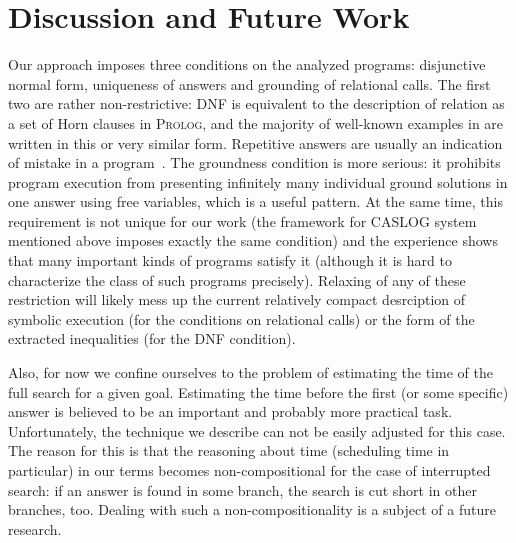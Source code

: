 \section{Discussion and Future Work}
\label{sec:discussion}

Our approach imposes three conditions on the analyzed programs: disjunctive normal form, uniqueness of answers and grounding of relational calls.
The first two are rather non-restrictive: DNF is equivalent to the description of relation as a set of Horn clauses in \textsc{Prolog},
and the majority of well-known examples in \mK are written in this or very similar form. Repetitive answers are usually an indication
of mistake in a program~\cite{WillsThesis}. The groundness condition is more serious: it prohibits program execution from presenting infinitely
many individual ground solutions in one answer using free variables, which is a useful pattern. At the same time, this requirement is
not unique for our work (the framework for \textsc{CASLOG} system mentioned above imposes exactly the same condition) and the experience
shows that many important kinds of programs satisfy it (although it is hard to characterize the class of such programs precisely).
Relaxing of any of these restriction will likely mess up the current relatively compact desrciption of symbolic execution (for
the conditions on relational calls) or the form of the extracted inequalities (for the DNF condition).

Also, for now we confine ourselves to the problem of estimating the time of the full search for a given goal. Estimating the time before
the first (or some specific) answer is believed to be an important and probably more practical task. Unfortunately, the technique we describe
can not be easily adjusted for this case. The reason for this is that the reasoning about time (scheduling time in particular) in our
terms becomes non-compositional for the case of interrupted search: if an answer is found in some branch, the search is cut short in
other branches, too. Dealing with such a non-compositionality is a subject of a future research.


